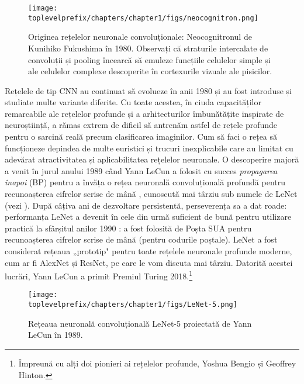 \documentclass[../../book-main_ro.tex]{subfiles}
\begin{document}
\begin{figure}
    \centering
    \texttt{[image: \\toplevelprefix/chapters/chapter1/figs/neocognitron.png]}
    \caption{Originea rețelelor neuronale convoluționale: Neocognitronul de Kunihiko Fukushima în 1980. Observați că straturile intercalate de convoluții și pooling încearcă să emuleze funcțiile celulelor simple și ale celulelor complexe descoperite în cortexurile vizuale ale pisicilor.}
    \label{fig:neocognitron}
\end{figure}

Rețelele de tip CNN au continuat să evolueze în anii 1980 și au fost introduse și studiate multe variante diferite. Cu toate acestea, în ciuda capacităților remarcabile ale rețelelor profunde și a arhitecturilor îmbunătățite inspirate de neuroștiință, a rămas extrem de dificil să antrenăm astfel de rețele profunde pentru o sarcină reală precum clasificarea imaginilor. Cum să faci o rețea să funcționeze depindea de multe euristici și trucuri inexplicabile care au limitat cu adevărat atractivitatea și aplicabilitatea rețelelor neuronale. O descoperire majoră a venit în jurul anului 1989 când Yann LeCun a folosit cu succes {\em propagarea înapoi} (BP) pentru a învăța o rețea neuronală convoluțională profundă pentru recunoașterea cifrelor scrise de mână \cite{LeCun-1989}, cunoscută mai târziu sub numele de LeNet (vezi ). După câțiva ani de dezvoltare persistentă, perseverența sa a dat roade: performanța LeNet a devenit în cele din urmă suficient de bună pentru utilizare practică la sfârșitul anilor 1990 \cite{LeCun-1998}: a fost folosită de Poșta SUA pentru recunoașterea cifrelor scrise de mână (pentru codurile poștale). LeNet a fost considerat rețeaua „prototip" pentru toate rețelele neuronale profunde moderne, cum ar fi AlexNet și ResNet, pe care le vom discuta mai târziu. Datorită acestei lucrări, Yann LeCun a primit Premiul Turing 2018.\footnote{Împreună cu alți doi pionieri ai rețelelor profunde, Yoshua Bengio și Geoffrey Hinton.}

\begin{figure}
    \centering
\texttt{[image: \\toplevelprefix/chapters/chapter1/figs/LeNet-5.png]}
    \caption{Rețeaua neuronală convoluțională LeNet-5 proiectată de Yann LeCun în 1989.}
    \label{fig:LeNet-5}
\end{figure}
\end{document}
